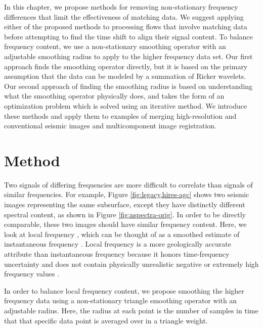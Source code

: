         In this chapter, we propose methods for removing non-stationary frequency differences that limit the effectiveness of matching data. 
        We suggest applying either of the proposed methods to processing flows that involve matching data before attempting to find the time shift to align their signal content. 
        To balance frequency content, we use a non-stationary smoothing operator with an adjustable smoothing radius to apply to the higher frequency data set. 
        Our first approach finds the smoothing operator directly, but it is based on the primary assumption that the data can be modeled by a summation of Ricker wavelets. 
        Our second approach of finding the smoothing radius is based on understanding what the smoothing operator physically does, and takes the form of an optimization problem which is solved using an iterative method. 
        We introduce these methods and apply them to examples of merging high-resolution and conventional seismic images and multicomponent image registration.

\section{Method}
        Two signals of differing frequencies are more difficult to correlate than signals of similar frequencies.  
        For example, Figure \ref{fig:legacy,hires-agc} shows two seismic images representing the same subsurface, except they have distinctly different spectral content, as shown in Figure \ref{fig:nspectra-orig}. 
        In order to be directly comparable, these two images should have similar frequency content.
        Here, we look at local frequency \cite[]{attr}, which can be thought of as a smoothed estimate of instantaneous frequency \cite[]{white}. 
        Local frequency is a more geologically accurate attribute than instantaneous frequency because it honors time-frequency uncertainty and does not contain physically unrealistic negative or extremely high frequency values \cite[]{attr}.

        In order to balance local frequency content, we propose smoothing the higher frequency data using a non-stationary triangle smoothing operator with an adjustable radius. 
        Here, the radius at each point is the number of samples in time that that specific data point is averaged over in a triangle weight.

